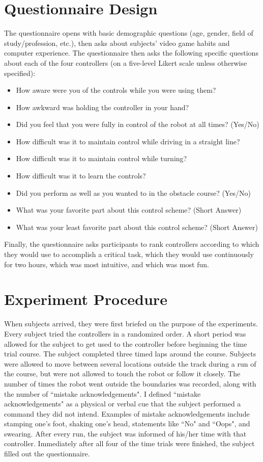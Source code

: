 \documentclass[12pt, letterpaper]{report}
\begin{document}
\section{Questionnaire Design}
The questionnaire opens with basic demographic questions (age, gender, field of study/profession, etc.), then   asks about subjects' video game habits and computer experience. The questionnaire then asks the following specific questions about each of the four controllers (on a five-level Likert scale unless otherwise specified):
\begin{itemize}
\item How aware were you of the controls while you were using them?
\item How awkward was holding the controller in your hand?
\item Did you feel that you were fully in control of the robot at all times? (Yes/No)
\item How difficult was it to maintain control while driving in a straight line? 
\item How difficult was it to maintain control while turning?
\item How difficult was it to learn the controls?
\item Did you perform as well as you wanted to in the obstacle course? (Yes/No)
\item What was your favorite part about this control scheme? (Short Answer)
\item What was your least favorite part about this control scheme? (Short Answer)
\end{itemize} 
Finally, the questionnaire asks participants to rank controllers according to which they would use to accomplish a critical task, which they would use continuously for two hours, which was most intuitive, and which was most fun.

\section{Experiment Procedure}
When subjects arrived, they were first briefed on the purpose of the experiments. Every subject tried the controllers in a randomized order. A short period was allowed for the subject to get used to the controller before beginning the time trial course. The subject completed three timed laps around the course. Subjects were allowed to move between several locations outside the track during a run of the course, but were not allowed to touch the robot or follow it closely. The number of times the robot went outside the boundaries was recorded, along with the number of ``mistake acknowledgements". I defined ``mistake acknowledgements" as a physical or verbal cue that the subject performed a command they did not intend. Examples of mistake acknowledgements include stamping one's foot, shaking one's head, statements like ``No" and ``Oops", and swearing. After every run, the subject was informed of his/her time with that controller. Immediately after all four of the time trials were finished, the subject filled out the questionnaire. 
\end{document}
